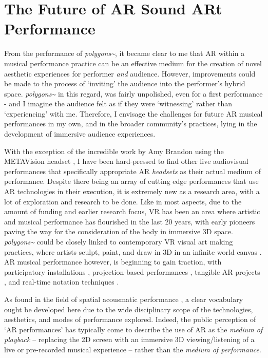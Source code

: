 \section{The Future of AR Sound ARt Performance}
From the performance of \textit{polygons\textasciitilde{}}, it became clear to me that AR within a musical performance practice can be an effective medium for the creation of novel aesthetic experiences for performer \textit{and} audience. However, improvements could be made to the process of `inviting' the audience into the performer's hybrid space. \textit{polygons\textasciitilde{}} in this regard, was fairly unpolished, even for a first performance - and I imagine the audience felt as if they were `witnessing' rather than `experiencing' with me. Therefore, I envisage the challenges for future AR musical performances in my own, and in the broader community's practices, lying in the development of immersive audience experiences.

 With the exception of the incredible work by Amy Brandon using the METAVision headset \citeyearpar{brandon2018}, I have been hard-pressed to find other live audiovisual performances that specifically appropriate AR \textit{headsets} as their actual medium of performance. Despite there being an array of cutting edge performances that use AR technologies in their execution, it is extremely new as a research area, with a lot of exploration and research to be done. Like in most aspects, due to the amount of funding and earlier research focus, VR has been an area where artistic and musical performance has flourished in the last 20 years, with early pioneers \citep{davies2004} paving the way for the consideration of the body in immersive 3D space. \textit{polygons\textasciitilde{}} could be closely linked to contemporary VR visual art making practices, where artists sculpt, paint, and draw in 3D in an infinite world canvas \citep{summers2019}. AR musical performance however, is beginning to gain traction, with participatory installations \citep{chevalier2018},  projection-based performances \citep{quay2016,berthaut2016,robinson2020}, tangible AR projects \citep{zamborlin2018}, and real-time notation techniques \citep{santini2020,santini2022}. 

As found in the field of spatial acousmatic performance \citep{sharma2015}, a clear vocabulary ought be developed here due to the wide disciplinary scope of the technologies, aesthetics, and modes of performance explored. Indeed, the public perception of `AR performances' has typically come to describe the use of AR as the \textit{medium of playback} -- replacing the 2D screen with an immersive 3D viewing/listening of a live or pre-recorded musical experience -- rather than the \textit{medium of performance}.


